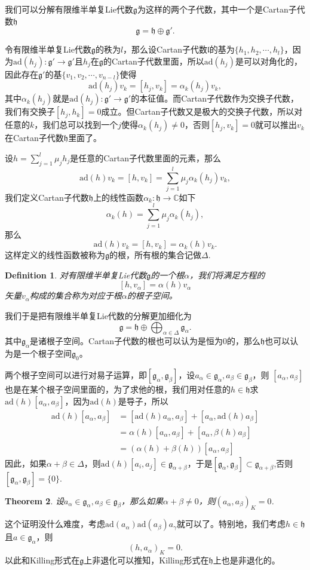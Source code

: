 \documentclass[9pt]{extbook}
\theoremstyle{plain}
\newtheorem{defi}{Definition}
\newtheorem{theo}[defi]{Theorem}
\newcommand{\cc}{\mathbb{C}}
\newcommand{\lag}{{\mathfrak{g}}}  %
\newcommand{\ad}{{\mathrm{ad}}}
\begin{document}
我们可以分解有限维半单复Lie代数$\lag$为这样的两个子代数，其中一个是Cartan子代数$\mathfrak{h}$
\[
	\lag=\mathfrak{h}\oplus \lag'.
\]

令有限维半单复Lie代数$\lag$的秩为$l$，那么设Cartan子代数$\mathfrak{l}$的基为$\{h_1,h_2,\cdots,h_l\}$，因为$\ad(h_j):\lag'\to \lag'$且$h_j$在$\lag$的Cartan子代数里面，所以$\ad(h_j)$是可以对角化的，因此存在$\lag'$的基$\{v_1,v_2,\cdots,v_{n-l}\}$使得
\[
	\ad(h_j)v_k=[h_j,v_k]=\alpha_{k}(h_j)v_k,
\]
其中$\alpha_{k}(h_j)$就是$\ad(h_j):\lag'\to \lag'$的本征值。而Cartan子代数作为交换子代数，我们有交换子$[h_j,h_k]=0$成立。但Cartan子代数又是极大的交换子代数，所以对任意的$k$，我们总可以找到一个$j$使得$\alpha_{k}(h_j)\neq 0$，否则$[h_j,v_k]=0$就可以推出$v_k$在Cartan子代数$\mathfrak{h}$里面了。

设$h=\sum_{j=1}^l\mu_jh_j$是任意的Cartan子代数里面的元素，那么
\[
	\ad(h)v_k=[h,v_k]=\sum_{j=1}^l\mu_j\alpha_{k}(h_j)v_k,
\]
我们定义Cartan子代数$\mathfrak{h}$上的线性函数$\alpha_{k}:\mathfrak{h}\to\cc$如下
\[
\alpha_{k}(h)=\sum_{j=1}^l\mu_j\alpha_{k}(h_j),
\]
那么
\[
	\ad(h)v_k=[h,v_k]=\alpha_{k}(h)v_k.
\]
这样定义的线性函数被称为$\lag$的根，所有根的集合记做$\Delta$.
\begin{defi}
对有限维半单复Lie代数$\lag$的一个根$\alpha$，我们将满足方程的
\[
[h,v_\alpha]=\alpha(h)v_\alpha
\]
矢量$v_\alpha$构成的集合称为对应于根$\alpha$的根子空间。
\end{defi}
我们于是把有限维半单复Lie代数的分解更加细化为
\[
	\lag=\mathfrak{h}\oplus \bigoplus_{\alpha\in\Delta} \lag_\alpha.
\]
其中$\lag_\alpha$是诸根子空间。Cartan子代数的根也可以认为是恒为0的，那么$\mathfrak{h}$也可以认为是一个根子空间$\lag_0$。

两个根子空间可以进行对易子运算，即$[\lag_\alpha,\lag_\beta]$，设$a_\alpha\in\lag_\alpha,a_\beta\in\lag_\beta$，则
$[a_\alpha,a_\beta]$也是在某个根子空间里面的，为了求他的根，我们用对任意的$h\in \mathfrak{h}$求$\ad(h)[a_\alpha,a_\beta]$，因为$\ad(h)$是导子，所以
\[
	\begin{split}
		\ad(h)[a_\alpha,a_\beta]&=[\ad(h)a_\alpha,a_\beta]+[a_\alpha,\ad(h)a_\beta]\\
		&=\alpha(h)[a_\alpha,a_\beta]+[a_\alpha,\beta(h)a_\beta]\\
		&=(\alpha(h)+\beta(h))[a_\alpha,a_\beta]
	\end{split}
\]
因此，如果$\alpha+\beta\in\Delta$，则$\ad(h)[a_i,a_j]\in \lag_{\alpha+\beta}$，于是$[\lag_\alpha,\lag_\beta]\subset \lag_{\alpha+\beta}$,否则$[\lag_\alpha,\lag_\beta]=\{0\}$.

\begin{theo}
设$a_\alpha\in\lag_\alpha,a_\beta\in\lag_\beta$，那么如果$\alpha+\beta\neq 0$，则$(a_\alpha,a_\beta)_K=0$.
\end{theo}
这个证明没什么难度，考虑$\ad(a_\alpha) \ad(a_\beta) a_\gamma$就可以了。特别地，我们考虑$h\in \mathfrak{h}$且$a\in \lag_\alpha$，则
\[
	(h,a_\alpha)_K=0.
\]
以此和Killing形式在$\mathfrak{g}$上非退化可以推知，Killing形式在$\mathfrak{h}$上也是非退化的。
\end{document}
